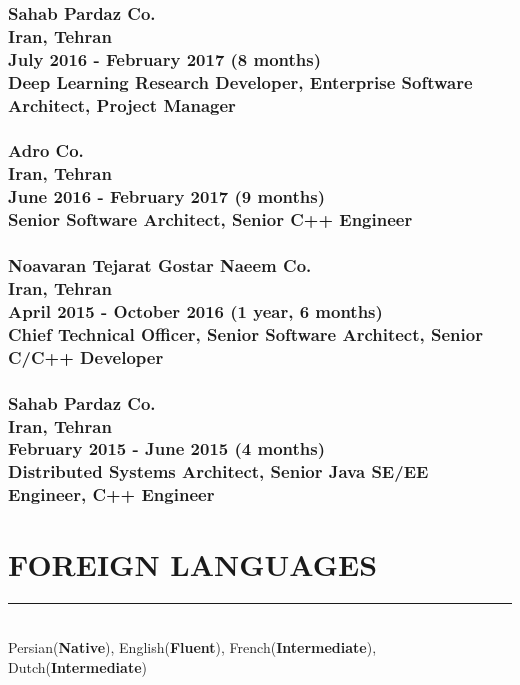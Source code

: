 \documentclass[10pt,a4paper]{article}
\begin{document}
\subsubsection{{ \textbullet \hspace{0.1cm} \large Sahab Pardaz Co.} \\
\textnormal{Iran, Tehran} \\
\textnormal{July 2016 - February 2017 (8 months)} \\
{Deep Learning Research Developer, Enterprise Software Architect, Project Manager}}
\vspace{0.2cm}

\subsubsection{{ \textbullet \hspace{0.1cm} \large Adro Co.} \\
\textnormal{Iran, Tehran} \\
\textnormal{June 2016 - February 2017 (9 months)} \\
{Senior Software Architect, Senior C++ Engineer}}
\vspace{0.2cm}

\subsubsection{{ \textbullet \hspace{0.1cm} \large Noavaran Tejarat Gostar Naeem Co.} \\
\textnormal{Iran, Tehran} \\
\textnormal{April 2015 - October 2016 (1 year, 6 months)} \\
{Chief Technical Officer, Senior Software Architect, Senior C/C++ Developer}}
\vspace{0.2cm}

\subsubsection{{ \textbullet \hspace{0.1cm} \large Sahab Pardaz Co.} \\
\textnormal{Iran, Tehran} \\
\textnormal{February 2015 - June 2015 (4 months)} \\
{Distributed Systems Architect, Senior Java SE/EE Engineer, C++ Engineer}}
\hfill


\section{FOREIGN LANGUAGES}
\noindent \rule {5.5cm}{0.4pt} \\
    Persian(\textbf{Native}),
    English(\textbf{Fluent}),
    French(\textbf{Intermediate}),
    Dutch(\textbf{Intermediate})
\end{document}

